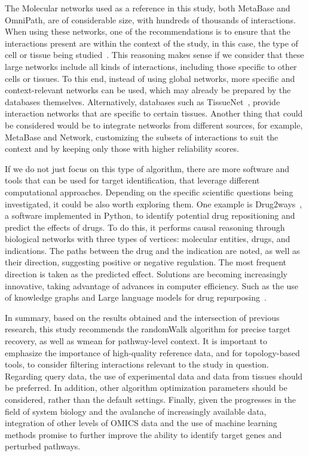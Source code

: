 The \gls{Molecular network}s used as a reference in this study, both MetaBase and OmniPath, are of considerable size, with hundreds of thousands of interactions. 
When using these networks, one of the recommendations is to ensure that the interactions present are within the context of the study, in this case, the type of cell or tissue being studied~\cite{RN38}. 
This reasoning makes sense if we consider that these large networks include all kinds of interactions, including those specific to other cells or tissues. 
To this end, instead of using global networks, more specific and context-relevant networks can be used, which may already be prepared by the databases themselves. 
Alternatively, databases such as TissueNet~\cite{RN137}, provide interaction networks that are specific to certain tissues. 
Another thing that could be considered would be to integrate networks from different sources, for example, MetaBase and Network, customizing the subsets of interactions to suit the context and by keeping only those with higher reliability scores. 

If we do not just focus on this type of algorithm, there are more software and tools that can be used for target identification, that leverage different computational approaches. 
Depending on the specific scientific questions being investigated, it could be also worth exploring them.
One example is Drug2ways~\cite{RN132}, a software implemented in Python, to identify potential drug repositioning and predict the effects of drugs. 
To do this, it performs causal reasoning through biological networks with three types of vertices: molecular entities, drugs, and indications. 
The paths between the drug and the indication are noted, as well as their direction, suggesting positive or negative regulation. The most frequent direction is taken as the predicted effect. 
Solutions are becoming increasingly innovative, taking advantage of advances in computer efficiency. 
Such as the use of knowledge graphs and Large language models for drug repurposing~\cite{RN163}. 

In summary, based on the results obtained and the intersection of previous research, this study recommends the randomWalk algorithm for precise target recovery, as well as wmean for pathway-level context. 
It is important to emphasize the importance of high-quality reference data, and for topology-based tools, to consider filtering interactions relevant to the study in question. 
Regarding query data, the use of experimental data and data from tissues should be preferred. 
In addition, other algorithm optimization parameters should be considered, rather than the default settings. 
Finally, given the progresses in the field of system biology and the avalanche of increasingly available data, integration of other levels of OMICS data and the use of machine learning methods promise to further improve the ability to identify target genes and perturbed pathways.
